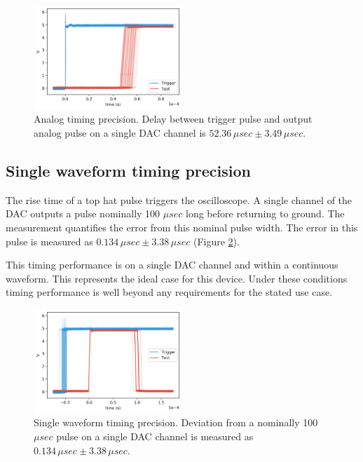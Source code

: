 \documentclass[10pt,a4paper]{article}
\begin{document}
\begin{figure}
	\centering
	\includegraphics[width=0.5\textwidth]{../output/analogJitter.png}
	\caption[analogJitter]{Analog timing precision. Delay between trigger pulse and output analog pulse on a single DAC channel is $52.36\,\mu sec \pm 3.49\, \mu sec$.\newline}
	\label{fig:analogJitter}
\end{figure}  

\subsection{Single waveform timing precision}
\label{subsec:topHatJitter}

The rise time of a top hat pulse triggers the oscilloscope. A single channel of the DAC outputs a pulse nominally 100 $\mu sec$ long before returning to ground.  The measurement quantifies the error from this nominal pulse width.  The error in this pulse is measured as $0.134\, \mu sec \pm 3.38 \,\mu sec$ (Figure \ref{fig:topHatJitter}). 

This timing performance is on a single DAC channel and within a continuous waveform.  This represents the ideal case for this device.  Under these conditions timing performance is well beyond any requirements for the stated use case. 

\begin{figure}
	\centering
	\includegraphics[width=0.5\textwidth]{../output/topHatJitter.png}
	\caption[topHatJitter]{Single waveform timing precision. Deviation from a nominally 100 $\mu sec$ pulse on a single DAC channel is measured as $0.134\, \mu sec \pm 3.38 \,\mu sec$. \newline}
	\label{fig:topHatJitter}
\end{figure}
\end{document}
